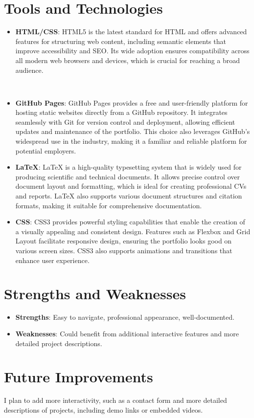 \documentclass{article}
\begin{document}
\section{Tools and Technologies}
\begin{itemize}
    \item \textbf{HTML/CSS}: HTML5 is the latest standard for HTML and offers advanced features for structuring web content, including semantic elements that improve accessibility and SEO. Its wide adoption ensures compatibility across all modern web browsers and devices, which is crucial for reaching a broad audience.
    
    \\
    
    \item \textbf{GitHub Pages}:  GitHub Pages provides a free and user-friendly platform for hosting static websites directly from a GitHub repository. It integrates seamlessly with Git for version control and deployment, allowing efficient updates and maintenance of the portfolio. This choice also leverages GitHub’s widespread use in the industry, making it a familiar and reliable platform for potential employers.
    \\
    
    \item \textbf{LaTeX}: LaTeX is a high-quality typesetting system that is widely used for producing scientific and technical documents. It allows precise control over document layout and formatting, which is ideal for creating professional CVs and reports. LaTeX also supports various document structures and citation formats, making it suitable for comprehensive documentation.

    \item \textbf{CSS}: CSS3 provides powerful styling capabilities that enable the creation of a visually appealing and consistent design. Features such as Flexbox and Grid Layout facilitate responsive design, ensuring the portfolio looks good on various screen sizes. CSS3 also supports animations and transitions that enhance user experience.
    
\end{itemize}

\section{Strengths and Weaknesses}
\begin{itemize}
    \item \textbf{Strengths}: Easy to navigate, professional appearance, well-documented.
    \item \textbf{Weaknesses}: Could benefit from additional interactive features and more detailed project descriptions.
\end{itemize}

\section{Future Improvements}
I plan to add more interactivity, such as a contact form and more detailed descriptions of projects, including demo links or embedded videos.
\end{document}
